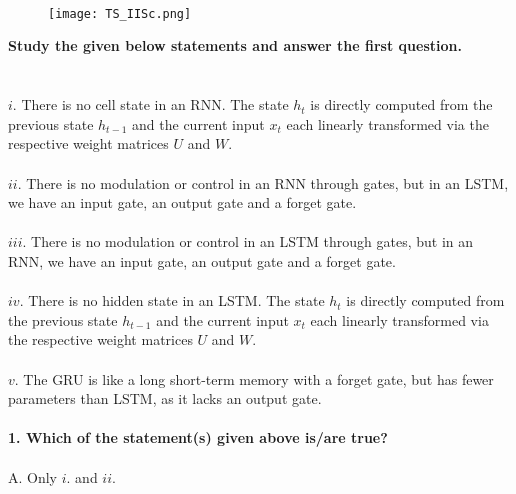 \documentclass[prl,twocolumn,showpacs,preprintnumbers,superscriptaddress]{revtex4}
\theoremstyle{plain}
\theoremstyle{definition}
\begin{document}
\begin{widetext}
\\
\\
\\

\begin{wrapfigure}
\centering
\end{wrapfigure}
\begin{figure}[h!]
 \begin{right}
  \hfill\texttt{[image: TS\_IISc.png]}
 \end{right}
\end{figure}
\noindent\textbf{Study the given below statements and answer the first question.}
\\
\\
\\
$i.$ There is no cell state in an RNN. The state $h_{t}$ is directly
computed from the previous state $h_{t-1}$ and the current input
$x_{t}$ each linearly transformed via the respective weight matrices
$U$ and $W$.
\\
\\
$ii.$ There is no modulation or control in an RNN through gates, but in an LSTM, we have an input gate, an output gate and a forget gate.
\\
\\
$iii.$ There is no modulation or control in an LSTM through gates, but in an RNN, we have an input gate, an output gate and a forget gate.
\\
\\
$iv.$ There is no hidden state in an LSTM. The state $h_{t}$ is directly
computed from the previous state $h_{t-1}$ and the current input
$x_{t}$ each linearly transformed via the respective weight matrices
$U$ and $W$.
\\
\\
$v.$ The GRU is like a long short-term memory with a forget gate, but has fewer parameters than LSTM, as it lacks an output gate.
\\
\\
\textbf{1. Which of the statement(s) given above is/are true?}
\\
\\
A. Only $i.$ and $ii.$
\\
\\

\end{widetext}
\end{document}

